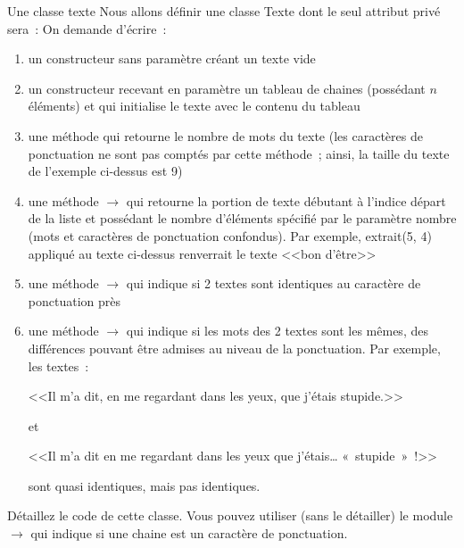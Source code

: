 \begin{Exercice}{Une classe texte}
	Nous allons définir une classe Texte dont le seul attribut privé sera~: 
	On demande d’écrire~:
	\begin{enumerate}
	\item
		un constructeur sans paramètre créant un texte vide
	\item
		un constructeur recevant en paramètre un tableau de chaines 
		(possédant $n$ éléments) et qui initialise le texte avec 
		le contenu du tableau
	\item
		une méthode  qui retourne le nombre de mots du texte 
		(les caractères de ponctuation ne sont pas comptés par cette méthode~; 
		ainsi, la taille du texte de l’exemple ci-dessus est 9)
	\item
		une méthode  $\rightarrow$ 
		qui retourne la portion de texte débutant à l’indice départ 
		de la liste et possédant le nombre d’éléments spécifié par 
		le paramètre nombre (mots et caractères de ponctuation confondus). 
		Par exemple, extrait(5, 4) appliqué au texte ci-dessus renverrait 
		le texte <<bon d’être>>
	\item
		une méthode  $\rightarrow$  
		qui indique si 2 textes sont identiques au caractère de ponctuation près
	\item
		une méthode  $\rightarrow$  
		qui indique si les mots des 2 textes sont les mêmes, des différences 
		pouvant être admises au niveau de la ponctuation. Par exemple, les textes~:
		
		<<Il m’a dit, en me regardant dans les yeux, que j’étais stupide.>>
		
		et
		
		<<Il m’a dit en me regardant dans les yeux que j’étais… «~stupide~»~!>>
		
		sont quasi identiques, mais pas identiques.
	\end{enumerate}
		Détaillez le code de cette classe. Vous pouvez utiliser (sans le détailler) le module
		 $\rightarrow$ 
		qui indique si une chaine est un caractère de ponctuation.
			
\end{Exercice}

